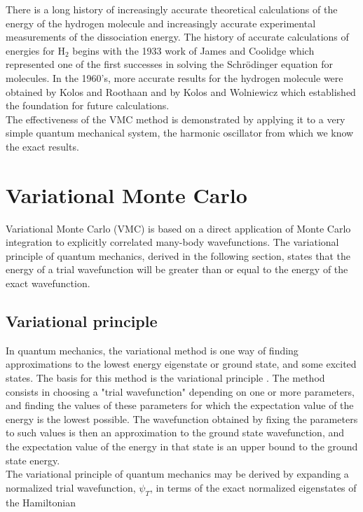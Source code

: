 \documentclass{article}
\begin{document}
There is a long history of increasingly accurate theoretical calculations of the energy of the hydrogen molecule and increasingly accurate experimental measurements of the dissociation energy. The history of accurate calculations of energies for H$_2$ begins with the 1933 work of James and Coolidge \citep{james1933ground} which represented one of the first successes in solving the Schr\"odinger equation for molecules. In the 1960's, more accurate results for the hydrogen molecule were obtained by Kolos and Roothaan \citep{kolos1960accurate} and by Kolos and Wolniewicz \citep{kolos1963nonadiabatic, kol1964accurate, kol1965potential, kolos1968improved} which established the foundation for future calculations. \\

The effectiveness of the VMC method is demonstrated by applying it to a very simple quantum mechanical system, the harmonic oscillator from which we know the exact results.

\section{Variational Monte Carlo}
Variational Monte Carlo (VMC) is based on a direct application of Monte Carlo integration to explicitly correlated many-body wavefunctions. The variational principle of quantum mechanics, derived in the following section, states that the energy of a trial wavefunction will be greater than or equal to the energy of the exact wavefunction\citep{griffiths1995introduction}.

\subsection{Variational principle}
In quantum mechanics, the variational method is one way of finding approximations to the lowest energy eigenstate or ground state, and some excited states. The basis for this method is the variational principle \citep{griffiths1995introduction, sakurai1994modern}. The method consists in choosing a "trial wavefunction" depending on one or more parameters, and finding the values of these parameters for which the expectation value of the energy is the lowest possible. The wavefunction obtained by fixing the parameters to such values is then an approximation to the ground state wavefunction, and the expectation value of the energy in that state is an upper bound to the ground state energy.\\

The variational principle of quantum mechanics may be derived by expanding a normalized trial wavefunction, $\psi_{T}$, in terms of the exact normalized eigenstates of the Hamiltonian
\end{document}
